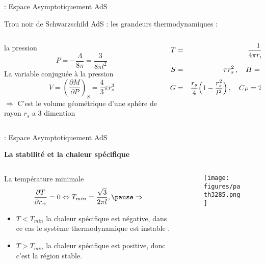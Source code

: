 \begin{frame}{\underline{\secname} : Espace Asymptotiquement AdS}
\begin{block}{Trou noir de Schwarzschild AdS :}
les grandeurs thermodynamiques :
\begin{columns}
	\begin{column}{0.5\linewidth}
		la pression
$$P=-\dfrac{\Lambda}{8 \pi}=\dfrac{3}{8 \pi l^2}$$
La variable conjuguée à la pression
$$V= \left(\frac{\partial M}{\partial P} \right)_S=\frac{4}{3}\pi r_s^3$$
\pause
$\Rightarrow$ C’est le volume géométrique d’une sphère de rayon $r_s$ a 3 dimention
\pause
	\end{column}
\begin{column}{0.5\linewidth}
 			
 \begin{eqnarray*}
T&=&\frac{1}{4\pi r_s l^2}(l^2+3r_s^2)\,,\nonumber\\
S&=&\pi r_s^2\,,\quad 
H=\frac{r_s}{2}\Bigl(1+\frac{r_s^2}{l^2}\Bigr)\,,\nonumber\\ G&=&\frac{r_s}{4}\Bigl(1-\frac{r_s^2}{l^2}\Bigr)\,,\quad
C_P=2\pi r_s^2\frac{3r_s^2+l^2}{3r_s^2-l^2}\,,
 \end{eqnarray*}
	\end{column}
\end{columns}
\end{block}

\end{frame}

\begin{frame}{\underline{\secname} : Espace Asymptotiquement AdS}


\begin{center}
	\textbf{La stabilité et la chaleur spécifique}
\end{center}

\begin{columns}
	\begin{column}{0.5\linewidth}
La température minimale
$$\dfrac{\partial T}{\partial r_{+}}=0 \Leftrightarrow T_{min}=\dfrac{\sqrt{3}}{2\pi l}, \pause \Rightarrow$$
	\begin{itemize}
		\item $T < T_{min} $ la chaleur spécifique est négative, dans ce cas le système thermodynamique est instable .
		\item $T > T_{min} $ la chaleur spécifique est positive, donc c’est la région stable.
		
	\end{itemize}

		
\end{column}
\begin{column}{0.5\linewidth}
	
			\begin{figure}
		\begin{center}
			\texttt{[image: figures/path3285.png]}
		\end{center}
	\end{figure}
			
\end{column}
\end{columns}

\end{frame}

